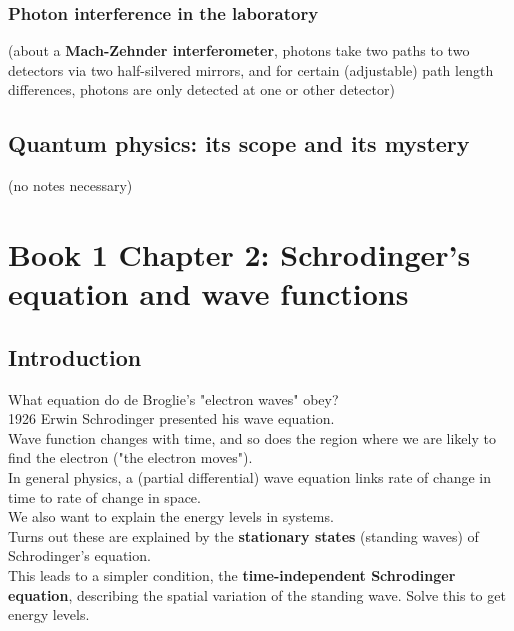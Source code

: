 \documentclass{article}
\begin{document}
\subsubsection{Photon interference in the laboratory}
(about a \textbf{Mach-Zehnder interferometer}, photons take two paths to two detectors via two half-silvered mirrors, and for certain (adjustable) path length differences, photons are only detected at one or other detector)

\subsection{Quantum physics: its scope and its mystery}
(no notes necessary)


\section{Book 1 Chapter 2: Schrodinger's equation and wave functions}
\subsection*{Introduction}
What equation do de Broglie's "electron waves" obey?\\
1926 Erwin Schrodinger presented his wave equation.\\
Wave function changes with time, and so does the region where we are likely to find the electron ("the electron moves").\\
In general physics, a (partial differential) wave equation links rate of change in time to rate of change in space.\\
We also want to explain the energy levels in systems.\\
Turns out these are explained by the \textbf{stationary states} (standing waves) of Schrodinger's equation.\\
This leads to a simpler condition, the \textbf{time-independent Schrodinger equation}, describing the spatial variation of the standing wave. Solve this to get energy levels.\\
\end{document}

